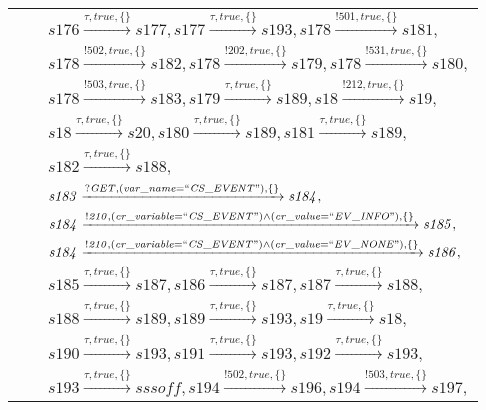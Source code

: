 \begin{tabular}{lcp{350px}}
& & $\mathit{s176}\xrightarrow{\mathit{\tau}, \mathit{true}, \{\}}\mathit{s177},\mathit{s177}\xrightarrow{\mathit{\tau}, \mathit{true}, \{\}}\mathit{s193},\mathit{s178}\xrightarrow{\mathit{!501}, \mathit{true}, \{\}}\mathit{s181},$ \\
& & $\mathit{s178}\xrightarrow{\mathit{!502}, \mathit{true}, \{\}}\mathit{s182},\mathit{s178}\xrightarrow{\mathit{!202}, \mathit{true}, \{\}}\mathit{s179},\mathit{s178}\xrightarrow{\mathit{!531}, \mathit{true}, \{\}}\mathit{s180},$ \\
& & $\mathit{s178}\xrightarrow{\mathit{!503}, \mathit{true}, \{\}}\mathit{s183},\mathit{s179}\xrightarrow{\mathit{\tau}, \mathit{true}, \{\}}\mathit{s189},\mathit{s18}\xrightarrow{\mathit{!212}, \mathit{true}, \{\}}\mathit{s19},$ \\
& & $\mathit{s18}\xrightarrow{\mathit{\tau}, \mathit{true}, \{\}}\mathit{s20},\mathit{s180}\xrightarrow{\mathit{\tau}, \mathit{true}, \{\}}\mathit{s189},\mathit{s181}\xrightarrow{\mathit{\tau}, \mathit{true}, \{\}}\mathit{s189},$ \\
& & $\mathit{s182}\xrightarrow{\mathit{\tau}, \mathit{true}, \{\}}\mathit{s188},$ \\
& & $\mathit{s183}\xrightarrow{\mathit{?GET}, \mathit{(var\_name = ``CS\_EVENT")}, \{\}}\mathit{s184},$ \\
& & $\mathit{s184}\xrightarrow{\mathit{!210}, \mathit{(cr\_variable = ``CS\_EVENT") \land (cr\_value = ``EV\_INFO")}, \{\}}\mathit{s185},$ \\
& & $\mathit{s184}\xrightarrow{\mathit{!210}, \mathit{(cr\_variable = ``CS\_EVENT") \land (cr\_value = ``EV\_NONE")}, \{\}}\mathit{s186},$ \\
& & $\mathit{s185}\xrightarrow{\mathit{\tau}, \mathit{true}, \{\}}\mathit{s187},\mathit{s186}\xrightarrow{\mathit{\tau}, \mathit{true}, \{\}}\mathit{s187},\mathit{s187}\xrightarrow{\mathit{\tau}, \mathit{true}, \{\}}\mathit{s188},$ \\
& & $\mathit{s188}\xrightarrow{\mathit{\tau}, \mathit{true}, \{\}}\mathit{s189},\mathit{s189}\xrightarrow{\mathit{\tau}, \mathit{true}, \{\}}\mathit{s193},\mathit{s19}\xrightarrow{\mathit{\tau}, \mathit{true}, \{\}}\mathit{s18},$ \\
& & $\mathit{s190}\xrightarrow{\mathit{\tau}, \mathit{true}, \{\}}\mathit{s193},\mathit{s191}\xrightarrow{\mathit{\tau}, \mathit{true}, \{\}}\mathit{s193},\mathit{s192}\xrightarrow{\mathit{\tau}, \mathit{true}, \{\}}\mathit{s193},$ \\
& & $\mathit{s193}\xrightarrow{\mathit{\tau}, \mathit{true}, \{\}}\mathit{sssoff},\mathit{s194}\xrightarrow{\mathit{!502}, \mathit{true}, \{\}}\mathit{s196},\mathit{s194}\xrightarrow{\mathit{!503}, \mathit{true}, \{\}}\mathit{s197},$ \\

\end{tabular}
